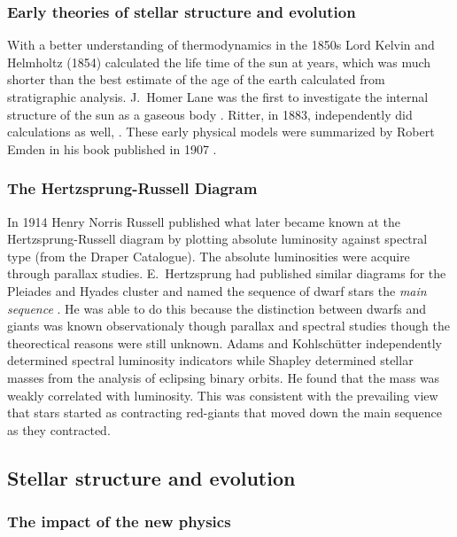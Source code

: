 \subsubsection{Early theories of stellar structure and evolution}

With a better understanding of thermodynamics in the
1850s Lord Kelvin and Helmholtz (1854) calculated the life time of the
sun at  years, which was much shorter than the best
estimate of the age of the earth calculated from stratigraphic
analysis. J.~Homer Lane was the first to investigate the internal
structure of the sun as a gaseous body \cite{Lane1870}. Ritter, in
1883, independently did calculations as well, \cite{Ritter1883,
Ritter1883a, Ritter1898}. These early physical
models were summarized by Robert Emden in his book 
published in 1907 \cite{Emden1907}.

\subsubsection{The Hertzsprung-Russell Diagram}

In 1914  Henry Norris Russell \cite{Russell1914a,
Russell1914b} published what later became known at the
Hertzsprung-Russell diagram by plotting absolute luminosity against
spectral type (from the Draper Catalogue). The absolute luminosities
were acquire through parallax
studies. E.~Hertzsprung  had published similar
diagrams for the Pleiades and Hyades cluster and named the sequence of
dwarf stars the \textit{main sequence} \cite{Hertzsprung1911}.  He was
able to do this because the distinction between dwarfs and giants was
known observationaly though parallax and spectral studies though the
theorectical reasons were still unknown. Adams and 
Kohlschütter \cite{Adams1914} independently determined spectral
luminosity indicators while Shapley determined stellar masses from the
analysis of eclipsing binary orbits. He found that the mass was weakly
correlated with luminosity.  This was consistent with the prevailing
view that stars started as contracting red-giants that moved down the
main sequence as they contracted.


\subsection{Stellar structure and evolution}

\subsubsection{The impact of the new physics}

